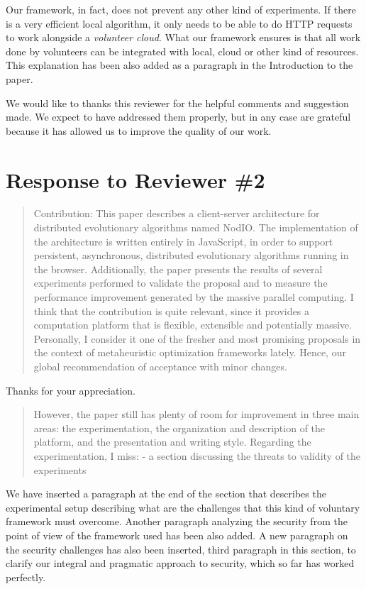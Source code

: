 \documentclass[preprint]{elsarticle}
\begin{document}
Our framework, in fact, does not prevent any other kind of
experiments. If there is a very efficient local algorithm, it only
needs to be able to do HTTP requests to work alongside a {\em
  volunteer cloud}. What our framework ensures is that all work done
by volunteers can be integrated with local, cloud or other kind of
resources. This explanation has been also added as a paragraph in the
Introduction to the paper.

We would like to thanks this reviewer for the helpful comments and
suggestion made. We expect to have addressed them properly, but in any
case are grateful because it has allowed us to improve the quality of
our work. 

\section{Response to Reviewer \#2}

\begin{quote}
Contribution:
This paper describes a client-server architecture for distributed evolutionary algorithms named NodIO.
The implementation of the architecture is written entirely in JavaScript, in order to support persistent,
asynchronous, distributed evolutionary algorithms running in the browser.
Additionally, the paper presents the results of several experiments performed to validate the proposal and
to measure the performance improvement generated by the massive parallel computing.
I think that the contribution is quite relevant, since it provides a computation platform that is flexible,
extensible and potentially massive. Personally, I consider it one of the fresher and most promising
proposals in the context of metaheuristic optimization frameworks lately. Hence, our global
recommendation of acceptance with minor changes.
\end{quote}

Thanks for your appreciation.

\begin{quote}
However, the paper still has plenty of room for improvement in three main areas: the experimentation, the
organization and description of the platform, and the presentation and writing style.
Regarding the experimentation, I miss:
-  a section discussing the threats to validity of the experiments

\end{quote}

We have inserted a paragraph at the end of the section that describes
the experimental setup describing what are the challenges that this
kind of voluntary framework must overcome. Another paragraph analyzing
the security from the point of view of the framework used has been
also added. A new paragraph on the security challenges has also been
inserted, third paragraph in this section, to clarify our integral and
pragmatic approach to security, which so far has worked perfectly. 
\end{document}
